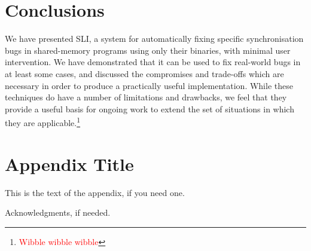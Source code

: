 \documentclass[10pt,twocolumn,preprint,natbib,authoryear]{sigplanconf}
\newcommand{\editorial}[1]{\textcolor{red}{\footnote{\textcolor{red}{#1}}}}
\begin{document}
\section{Conclusions}

We have presented SLI, a system for automatically fixing specific
synchronisation bugs in shared-memory programs using only their
binaries, with minimal user intervention.  We have demonstrated that
it can be used to fix real-world bugs in at least some cases, and
discussed the compromises and trade-offs which are necessary in order
to produce a practically useful implementation.  While these
techniques do have a number of limitations and drawbacks, we feel that
they provide a useful basis for ongoing work to extend the set of
situations in which they are applicable.\editorial{Wibble wibble
  wibble}

\appendix
\section{Appendix Title}

This is the text of the appendix, if you need one.

\acks

Acknowledgments, if needed.



    
\end{document}
